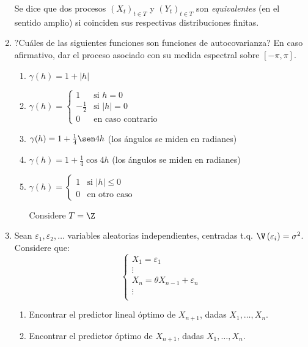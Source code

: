 \begin{enumerate}
\begin{definicion}
 Se dice que dos procesos $(X_{t} )_{t\in T} $ y 
$(Y_{t} )_{t\in T} $ son \emph{equivalentes} (en el 
sentido amplio) si coinciden sus respectivas distribuciones finitas. 
\end{definicion}


\item ?Cu\'{a}les de las siguientes funciones son funciones de autocovarianza? En caso afirmativo, dar el proceso asociado con su medida espectral sobre $\left[ {-\pi ,\pi } \right]$.

\begin{enumerate}
\item $\gamma (h)=1+\left| h \right|$
\item $\gamma (h)=\begin{cases}
                   1&\text{si } h=0\\
                   -\frac 1 2&\text{si } |h|=0\\
                   0&\text{en caso contrario}
                  \end{cases}$

\item $\gamma (h)=1+\frac{1}{4}\sen 4h$ (los \'{a}ngulos se miden en radianes)

\item $\gamma (h)=1+\frac{1}{4}\cos 4h$ (los \'{a}ngulos se miden en radianes)

\item $\gamma (h)=\begin{cases}
                   1&\text{si } |h|\leq 0\\
                   0&\text{en otro caso}
                  \end{cases}$

                  Considere $T=\Z$
\end{enumerate}

\item Sean $\varepsilon_{1} ,\varepsilon_{2} ,\ldots$ variables aleatorias independientes, centradas t.q. $\V\left( \varepsilon_{i} \right)=\sigma^{2}$. Considere que: 
\[
\left\{ {\begin{array}{l}
 X_{1} =\varepsilon_{1} \\ 
 \vdots \\ 
 X_{n} =\theta X_{n-1} +\varepsilon_{n} \\ 
 \vdots \\ 
 \end{array}} \right.
\]
\begin{enumerate}
\item Encontrar el predictor lineal \'{o}ptimo de $X_{n+1} $, dadas $X_{1} ,\ldots,X_{n}.$
\item Encontrar el predictor \'{o}ptimo de $X_{n+1} $, dadas $X_{1} ,\ldots,X_{n} $.
\end{enumerate}

\end{enumerate}
